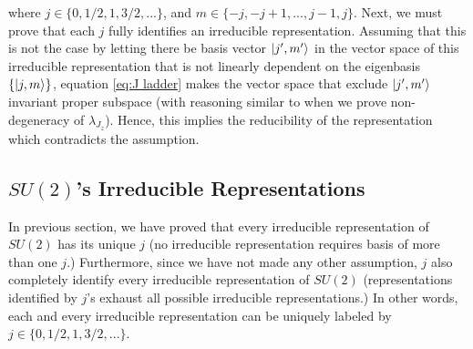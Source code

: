 \documentclass[preprint, 12pt]{revtex4-2}
\numberwithin{equation}{section}
\begin{document}
where $j \in \{0, 1/2, 1, 3/2, ...\}$, and $m \in \{-j, -j+1, ..., j-1, j\}$. Next, we must prove that each $j$ fully identifies an irreducible representation. Assuming that this is not the case by letting there be basis vector $\ket{j', m'}$ in the vector space of this irreducible representation that is not linearly dependent on the eigenbasis $\{\ket{j,m}\}$, equation \ref{eq:J ladder} makes the vector space that exclude $\ket{j', m'}$ invariant proper subspace (with reasoning similar to when we prove non-degeneracy of $\lambda_{J_z}$). Hence, this implies the reducibility of the representation which contradicts the assumption. 

\subsection{$SU(2)$'s Irreducible Representations}
In previous section, we have proved that every irreducible representation of $SU(2)$ has its unique $j$ (no irreducible representation requires basis of more than one $j$.) Furthermore, since we have not made any other assumption, $j$ also completely identify every irreducible representation of $SU(2)$ (representations identified by $j$'s exhaust all possible irreducible representations.) In other words, each and every irreducible representation can be uniquely labeled by $j \in \{0, 1/2, 1, 3/2, ...\}$.
\end{document}
